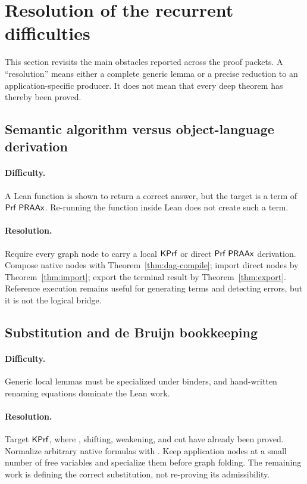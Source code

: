 \section{Resolution of the recurrent difficulties}

This section revisits the main obstacles reported across the proof packets.  A
``resolution'' means either a complete generic lemma or a precise reduction to
an application-specific producer.  It does not mean that every deep theorem
has thereby been proved.

\subsection{Semantic algorithm versus object-language derivation}

\paragraph{Difficulty.}
A Lean function is shown to return a correct answer, but the target is a term of
\(\mathsf{Prf}\;\mathsf{PRAAx}\).  Re-running the function inside Lean does not create such a
term.

\paragraph{Resolution.}
Require every graph node to carry a local \(\mathsf{KPrf}\) or direct
\(\mathsf{Prf}\;\mathsf{PRAAx}\) derivation.  Compose native nodes with
Theorem~\ref{thm:dag-compile}; import direct nodes by
Theorem~\ref{thm:import}; export the terminal result by
Theorem~\ref{thm:export}.  Reference execution remains useful for generating
terms and detecting errors, but it is not the logical bridge.

\subsection{Substitution and de Bruijn bookkeeping}

\paragraph{Difficulty.}
Generic local lemmas must be specialized under binders, and hand-written
renaming equations dominate the Lean work.

\paragraph{Resolution.}
Target \(\mathsf{KPrf}\), where , shifting, weakening, and cut have
already been proved.  Normalize arbitrary native formulas with .
Keep application nodes at a small number of free variables and specialize them
before graph folding.  The remaining work is defining the correct substitution,
not re-proving its admissibility.

